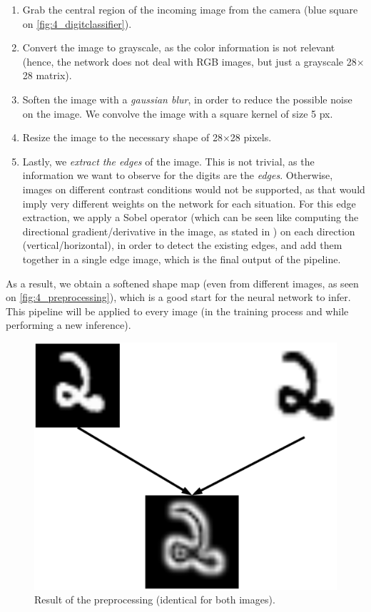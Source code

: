 		\begin{enumerate}
			\item Grab the central region of the incoming image from the camera (blue square on \autoref{fig:4_digitclassifier}).
			
			\item Convert the image to grayscale, as the color information is not relevant (hence, the network does not deal with RGB images, but just a grayscale 28$\times$28 matrix).
			
			\item Soften the image with a \emph{gaussian blur}, in order to reduce the possible noise on the image. We convolve the image with a square kernel of size 5 px.
			
			\item Resize the image to the necessary shape of 28$\times$28 pixels.
			
			\item Lastly, we \emph{extract the edges} of the image. This is not trivial, as the information we want to observe for the digits are the \emph{edges}. Otherwise, images on different contrast conditions would not be supported, as that would imply very different weights on the network for each situation. For this edge extraction, we apply a Sobel operator (which can be seen like computing the directional gradient/derivative in the image, as stated in \cite{sobel}) on each direction (vertical/horizontal), in order to detect the existing edges, and add them together in a single edge image, which is the final output of the pipeline.
		\end{enumerate}
		
		As a result, we obtain a softened shape map (even from different images, as seen on \autoref{fig:4_preprocessing}), which is a good start for the neural network to infer. This pipeline will be applied to every image (in the training process and while performing a new inference).
		
		\begin{figure}[h]
			\centering
			\includegraphics[width=5in]{images/digits_preprocessing}
			\caption{Result of the preprocessing (identical for both images).}
			\label{fig:4_preprocessing}
		\end{figure}


